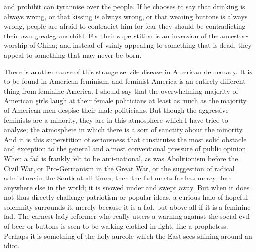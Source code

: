 \documentclass{book}
\begin{document}
and prohibit can tyrannise over the people. If he chooses to say that drinking is always wrong, or that kissing is always wrong, or that wearing buttons is always wrong, people are afraid to contradict him for fear they should be contradicting their own great-grandchild. For their superstition is an inversion of the ancestor-worship of China; and instead of vainly appealing to something that is dead, they appeal to something that may never be born.

There is another cause of this strange servile disease in American democracy. It is to be found in American feminism, and feminist America is an entirely different thing from feminine America. I should say that the overwhelming majority of American girls laugh at their female politicians at least as much as the majority of American men despise their male politicians. But though the aggressive feminists are a minority, they are in this atmosphere which I have tried to analyse; the atmosphere in which there is a sort of sanctity about the minority. And it is this superstition of seriousness that constitutes the most solid obstacle and exception to the general and almost conventional pressure of public opinion. When a fad is frankly felt to be anti-national, as was Abolitionism before the Civil War, or Pro-Germanism in the Great War, or the suggestion of radical admixture in the South at all times, then the fad meets far less mercy than anywhere else in the world; it is snowed under and swept away. But when it does not thus directly challenge patriotism or popular ideas, a curious halo of hopeful solemnity surrounds it, merely because it is a fad, but above all if it is a feminine fad. The earnest lady-reformer who really utters a warning against the social evil of beer or buttons is seen to be walking clothed in light, like a prophetess. Perhaps it is something of the holy aureole which the East sees shining around an idiot.
\end{document}
